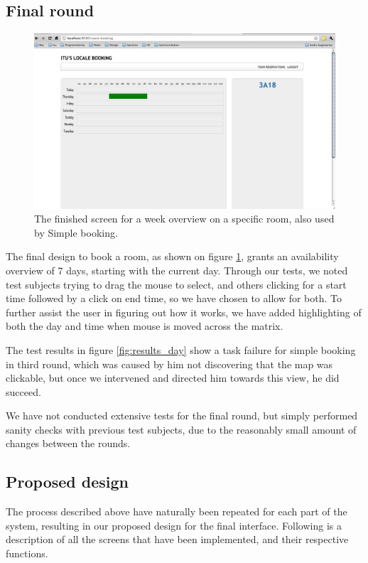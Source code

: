 \subsection{Final round}
\begin{figure}[htb]
\begin{center}
\leavevmode
\includegraphics[width=1\textwidth]{images/weekFinal}
\end{center}
\caption{The finished screen for a week overview on a specific room, also used by Simple booking.}
\label{fig:week_final}
\end{figure}

The final design to book a room, as shown on figure \ref{fig:week_final}, grants an availability overview of 7 days, starting with the current day. Through our tests, we noted test subjects trying to drag the mouse to select, and others clicking for a start time followed by a click on end time, so we have chosen to allow for both.
To further assist the user in figuring out how it works, we have added highlighting of both the day and time when mouse is moved across the matrix.

The test results in figure \ref{fig:results_day} show a task failure for simple booking in third round, which was caused by him not discovering that the map was clickable, but once we intervened and directed him towards this view, he did succeed.

We have not conducted extensive tests for the final round, but simply performed sanity checks with previous test subjects, due to the reasonably small amount of changes between the rounds.


\pagebreak
\subsection{Proposed design}
\label{sec:proposed_design_dtd}
The process described above have naturally been repeated for each part of the system, resulting in our proposed design for the final interface.
Following is a description of all the screens that have been implemented, and their respective functions.

